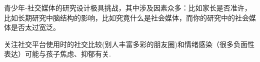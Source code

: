 青少年-社交媒体的研究设计极具挑战，其中涉及因素众多：比如家长是否准许，比如长期研究中脑结构的影响，比如究竟什么是社会媒体，而你的研究中的社会媒体是否太过宽泛。


关注社交平台使用时的社交比较(别人丰富多彩的朋友圈)和情绪感染（很多负面性表达）可能与孩子焦虑、抑郁有关.


